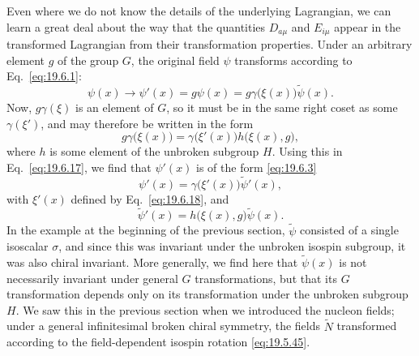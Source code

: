 Even where we do not know the details of the underlying Lagrangian, we can learn a great deal about the way that the quantities $D_{a\mu}$ and $E_{i\mu}$ appear in the transformed Lagrangian from their transformation properties. Under an arbitrary element $g$ of the group $G$, the original field $\psi$ transforms according to Eq.~\eqref{eq:19.6.1}:
\begin{equation}
\psi(x)\longrightarrow\psi'(x)
=g\psi(x)=g\gamma\bigl(\xi(x)\bigr)\widetilde\psi(x).
\tag{19.6.17}\label{eq:19.6.17}
\end{equation}
Now, $g\gamma(\xi)$ is an element of $G$, so it must be in the same right coset as some $\gamma(\xi')$, and may therefore be written in the form
\begin{equation}
g\gamma\bigl(\xi(x)\bigr)
=\gamma\bigl(\xi'(x)\bigr)h\bigl(\xi(x),g\bigr),
\tag{19.6.18}\label{eq:19.6.18}
\end{equation}
where $h$ is some element of the unbroken subgroup $H$. Using this in Eq.~\eqref{eq:19.6.17}, we find that $\psi'(x)$ is of the form \eqref{eq:19.6.3}
\begin{equation}
\psi'(x)=\gamma\bigl(\xi'(x)\bigr)\widetilde\psi'(x),
\tag{19.6.19}\label{eq:19.6.19}
\end{equation}
with $\xi'(x)$ defined by Eq.~\eqref{eq:19.6.18}, and
\begin{equation}
\widetilde\psi'(x)
=h\bigl(\xi(x),g\bigr)\widetilde\psi(x).
\tag{19.6.20}\label{eq:19.6.20}
\end{equation}
In the example at the beginning of the previous section, $\widetilde\psi$ consisted of a single isoscalar $\sigma$, and since this was invariant under the unbroken isospin subgroup, it was also chiral invariant. More generally, we find here that $\widetilde\psi(x)$ is not necessarily invariant under general $G$ transformations, but that its $G$ transformation depends only on its transformation under the unbroken subgroup $H$. We saw this in the previous section when we introduced the nucleon fields; under a general infinitesimal broken chiral symmetry, the fields $\widetilde N$ transformed according to the field-dependent isospin rotation \eqref{eq:19.5.45}.

